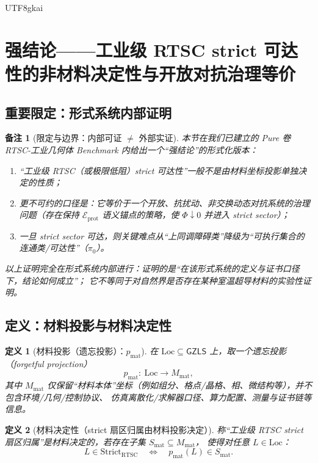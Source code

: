 \documentclass[12pt]{article}
\newtheorem{definition}{定义}[section]
\newtheorem{remark}{备注}[section]
\newcommand{\GZLS}{\ensuremath{\mathsf{GZLS}}}
\newcommand{\RTSC}{\textsf{RTSC}}
\begin{document}
\begin{CJK*}{UTF8}{gkai}
\clearpage
\section{强结论——工业级 \RTSC{} strict 可达性的非材料决定性与开放对抗治理等价}
\label{sec:puremath-nonmaterial-governance}

\subsection{重要限定：形式系统内部证明}

\begin{remark}[限定与边界：内部可证 $\neq$ 外部实证]
本节在我们已建立的 Pure 卷 \RTSC{}-工业几何体 Benchmark 内给出一个“强结论”的形式化版本：
\begin{enumerate}
  \item “工业级 \RTSC{}（或极限低阻）strict 可达性”一般不是由材料坐标投影单独决定的性质；
  \item 更不可约的口径是：它等价于一个开放、抗扰动、非交换动态对抗系统的治理问题（存在保持 $\mathcal{E}_{\mathrm{prot}}$ 语义锚点的策略，使 $\Phi\downarrow 0$ 并进入 strict
    sector）；
  \item 一旦 strict sector 可达，则关键难点从“上同调障碍类”降级为“可执行集合的连通类/可达性”（$\pi_0$）。
\end{enumerate}
以上证明完全在形式系统内部进行：证明的是“在该形式系统的定义与证书口径下，结论如何成立”；
它不等同于对自然界是否存在某种室温超导材料的实验性证明。
\end{remark}

\subsection{定义：材料投影与材料决定性}

\begin{definition}[材料投影（遗忘投影）：$p_{\mathrm{mat}}$]
\label{def:p-mat-projection}
在 $\mathrm{Loc}\subseteq\GZLS$ 上，取一个遗忘投影（forgetful projection）
\[
p_{\mathrm{mat}}:\ \mathrm{Loc}\to M_{\mathrm{mat}},
\]
其中 $M_{\mathrm{mat}}$ 仅保留“材料本体”坐标（例如组分、格点/晶格、相、微结构等），并\emph{不}包含环境/几何/控制协议、
仿真离散化/求解器口径、算力配置、测量与证书链等信息。
\end{definition}

\begin{definition}[材料决定性（strict 扇区归属由材料投影决定）]
\label{def:material-determinacy}
称“工业级 \RTSC{} strict 扇区归属”是材料决定的，若存在子集 $S_{\mathrm{mat}}\subseteq M_{\mathrm{mat}}$，
使得对任意 $L\in\mathrm{Loc}$：
\[
L\in \mathrm{Strict}_{\mathrm{RTSC}}
\quad\Longleftrightarrow\quad
p_{\mathrm{mat}}(L)\in S_{\mathrm{mat}}.
\]
\end{definition}


\end{CJK*}
\end{document}
